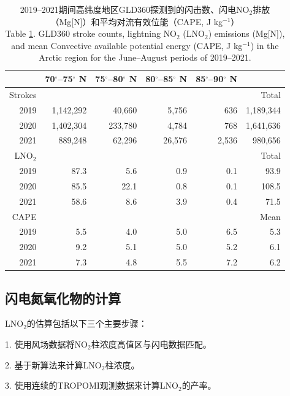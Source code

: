 \begin{table}
\centering
\caption{2019--2021期间高纬度地区GLD360探测到的闪击数、闪电NO$_2$排放（Mg[N]）和平均对流有效位能（CAPE, J kg$^{-1}$）\\
Table \ref{table:arctic_emission}. GLD360 stroke counts, lightning NO$_2$ (LNO$_2$) emissions (Mg[N]), and mean Convective available potential energy (CAPE, J kg$^{-1}$) in the Arctic region for the June--August periods of 2019--2021.
}
\label{table:arctic_emission}
\begin{tabular}{rrrrrr}
\hline
{} & 70$^{\circ}$--75$^{\circ}$ N & 75$^{\circ}$--80$^{\circ}$ N &
80$^{\circ}$--85$^{\circ}$ N &  85$^{\circ}$--90$^{\circ}$ N &  \\
\hline
Strokes & & & & & Total \\
\hline
2019 &   1,142,292 &     40,660 &      5,756 &       636  & 1,189,344 \\
2020 &   1,402,304 &    233,780 &      4,784 &       768  &  1,641,636 \\
2021 &     889,248 &     62,296 &     26,576 &      2,536  &  980,656 \\
\hline
LNO$_2$ & & & & & Total \\
\hline
2019 &      87.3 &       5.6 &       0.9 &       0.1 &   93.9 \\
2020 &      85.5 &      22.1 &       0.8 &       0.1 &  108.5 \\
2021 &      58.6 &       8.6 &       3.9 &       0.4 &   71.5 \\
\hline
CAPE & & & & & Mean \\
\hline
2019 & 5.5  & 4.0  & 5.0  & 6.5 & 5.3 \\
2020 & 9.2  & 5.1  & 5.0  & 5.2 & 6.1 \\
2021 & 7.3  & 4.8  & 5.5  & 7.2 & 6.2 \\
\hline
\end{tabular}
\end{table}


\subsection{闪电氮氧化物的计算}

LNO$_2$的估算包括以下三个主要步骤：

1. 使用风场数据将NO$_2$柱浓度高值区与闪电数据匹配。

2. 基于新算法来计算LNO$_2$柱浓度。

3. 使用连续的TROPOMI观测数据来计算LNO$_2$的产率。

